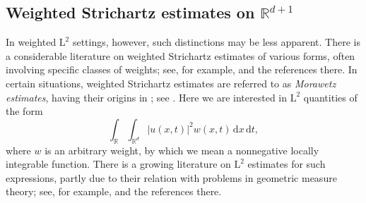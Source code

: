 \documentclass[10pt,a4paper]{amsart}
\numberwithin{equation}{section}
\newcommand{\dd}{\,\mathrm{d}}
\begin{document}
\subsection{Weighted Strichartz estimates on \texorpdfstring{$\mathbb{R}^{d+1}$}{Euclidean space}}
In weighted $\mathrm{L}^2$ settings, however, such distinctions may be less apparent. 
There is a considerable literature on weighted Strichartz estimates of various forms, often involving specific classes of weights; see, for example, \cite{BRV} and the references there. In certain situations, weighted Strichartz estimates are referred to as \textit{Morawetz estimates}, having their origins in \cite{Mor}; see \cite{TaoDisp}. 
Here we are interested in $\mathrm{L}^2$ quantities of the form
\begin{equation}\label{weightednorm}
\int_{\mathbb{R}} \int_{\mathbb{R}^d} |u(x,t)|^2w(x,t)\dd x\dd t,
\end{equation}
where $w$ is an arbitrary weight, by which we mean a nonnegative locally integrable function. There is a growing literature on $\mathrm{L}^2$ estimates for such expressions, partly due to their relation with problems in geometric measure theory; see, for example, \cite{Du} and the references there.
\end{document}
